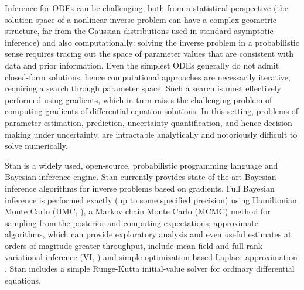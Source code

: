 \documentclass[11pt]{article}
\begin{document}
Inference for ODEs can be challenging, both from a statistical
perspective (the solution space of a nonlinear inverse problem can
have a complex geometric structure, far from the Gaussian
distributions used in standard asymptotic inference) and also
computationally: solving the inverse problem in a probabilistic sense
requires tracing out the space of parameter values that are consistent
with data and prior information.  Even the simplest ODEs generally do
not admit closed-form solutions, hence computational approaches are
necessarily iterative, requiring a search through parameter space.
Such a search is most effectively performed using gradients, which in
turn raises the challenging problem of computing gradients of
differential equation solutions. In this setting, problems of
parameter estimation, prediction, uncertainty quantification, and
hence decision-making under uncertainty, are intractable analytically
and notoriously difficult to solve numerically.

Stan \cite{carpenter-et-al:2016, stan-development-team:2016,
  mcelreath:2016} is a widely used, open-source, probabilistic
programming language and Bayesian inference engine.  Stan currently
provides state-of-the-art Bayesian inference algorithms for inverse
problems based on gradients.  Full Bayesian inference is performed
exactly (up to some specified precision) using Hamiltonian Monte Carlo
(HMC, \cite{neal:2011}), a Markov chain Monte Carlo (MCMC) method for
sampling from the posterior and computing expectations; approximate
algorithms, which can provide exploratory analysis and even useful
estimates at orders of magitude greater throughput, include mean-field
and full-rank variational inference (VI,
\cite{wainwright-jordan:2008}) and simple optimization-based Laplace
approximation \cite{gelman-et-al:2013}.  Stan includes a simple
Runge-Kutta initial-value solver for ordinary differential equations.
\end{document}
